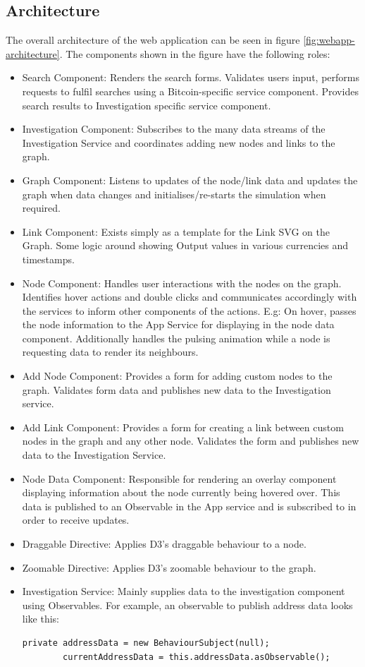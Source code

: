\subsection{Architecture}
The overall architecture of the web application can be seen in figure \ref{fig:webapp-architecture}. The components shown in the figure have the following roles:
\begin{itemize}
    \item Search Component: Renders the search forms. Validates users input, performs requests to fulfil searches using a Bitcoin-specific service component. Provides search results to Investigation specific service component. 
    \item Investigation Component: Subscribes to the many data streams of the Investigation Service and coordinates adding new nodes and links to the graph. 
    \item Graph Component: Listens to updates of the node/link data and updates the graph when data changes and initialises/re-starts the simulation when required. 
    \item Link Component: Exists simply as a template for the Link SVG on the Graph. Some logic around showing Output values in various currencies and timestamps. 
    \item Node Component: Handles user interactions with the nodes on the graph. Identifies hover actions and double clicks and communicates accordingly with the services to inform other components of the actions. E.g: On hover, passes the node information to the App Service for displaying in the node data component. Additionally handles the pulsing animation while a node is requesting data to render its neighbours. 
    \item Add Node Component: Provides a form for adding custom nodes to the graph. Validates form data and publishes new data to the Investigation service.  
    \item Add Link Component: Provides a form for creating a link between custom nodes in the graph and any other node. Validates the form and publishes new data to the Investigation Service. 
    \item Node Data Component: Responsible for rendering an overlay component displaying information about the node currently being hovered over. This data is published to an Observable in the App service and is subscribed to in order to receive updates. 
    \item Draggable Directive: Applies D3's draggable behaviour to a node. 
    \item Zoomable Directive: Applies D3's zoomable behaviour to the graph. 
    \item Investigation Service: Mainly supplies data to the investigation component using Observables. For example, an observable to publish address data looks like this:
    \begin{lstlisting}[breaklines=true, basicstyle=\small]
        private addressData = new BehaviourSubject(null);
        currentAddressData = this.addressData.asObservable();
        

\end{lstlisting}
\end{itemize}
